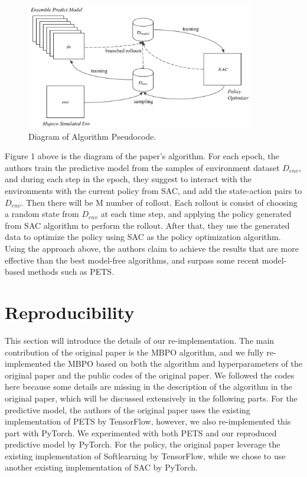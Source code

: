 \documentclass{article}
\begin{document}
\begin{figure}[h]
  \centering
  \includegraphics[width=10cm]{mbpo_new.png}
  \caption{Diagram of Algorithm Pseudocode.}
\end{figure}

Figure 1 above is the diagram of the paper's algorithm. For each epoch, the authors train the predictive model from the samples of environment dataset $D_{env}$, and during each step in the epoch, they suggest to interact with the environments with the current policy from SAC, and add the state-action pairs to $D_{env}$. Then there will be M number of rollout. Each rollout is consist of choosing a random state from $D_{env}$ at each time step, and applying the policy generated from SAC algorithm to perform the rollout. After that, they use the generated data to optimize the policy using SAC as the policy optimization algorithm. Using the approach above, the authors claim to achieve the results that are more effective than the best model-free algorithms, and surpass some recent model-based methods such as PETS.

\section{Reproducibility}
This section will introduce the details of our re-implementation. The main contribution of the original paper is the MBPO algorithm, and we fully re-implemented the MBPO based on both the algorithm and hyperparameters of the original paper and the public codes of the original paper. We followed the codes here because some details are missing in the description of the algorithm in the original paper, which will be discussed extensively in the following parts. For the predictive model, the authors of the original paper uses the existing implementation of PETS by TensorFlow, however, we also re-implemented this part with PyTorch. We experimented with both PETS and our reproduced predictive model by PyTorch. For the policy, the original paper leverage the existing implementation of Softlearning by TensorFlow, while we chose to use another existing implementation of SAC by PyTorch.
\end{document}
